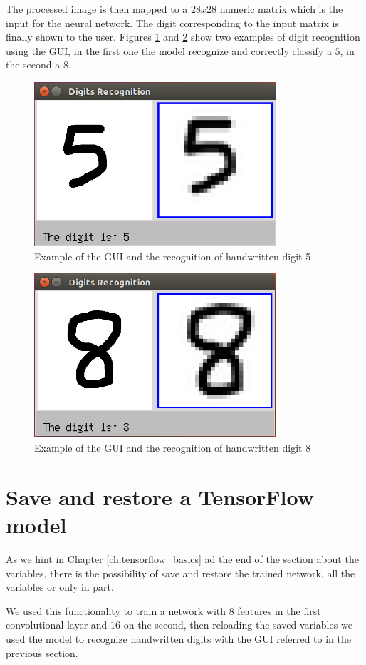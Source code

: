 The processed image is then mapped to a $28x28$ numeric matrix which is the input for the neural network. The digit corresponding to the input matrix is finally shown to the user. Figures \ref{fig:GUI_5} and \ref{fig:GUI_8} show two examples of digit recognition using the \acs{GUI}, in the first one the model recognize and correctly classify a $5$, in the second a $8$.

\begin{figure}
	\caption{Example of the GUI and the recognition of handwritten digit 5}
	\label{fig:GUI_5}
	\centering
	\includegraphics[width=0.8\textwidth]{Images/GUI_5}
\end{figure}

\begin{figure}
\caption{Example of the GUI and the recognition of handwritten digit 8}
\label{fig:GUI_8}
\centering
\includegraphics[width=0.8\textwidth]{Images/GUI_8}
\end{figure}

\section{Save and restore a TensorFlow model}

As we hint in Chapter \ref{ch:tensorflow_basics} ad the end of the section about the variables, there is the possibility of save and restore the trained network, all the variables or only in part.

We used this functionality to train a network with $8$ features in the first convolutional layer and $16$ on the second, then reloading the saved variables we used the model to recognize handwritten digits with the GUI referred to in the previous section.